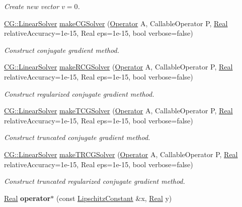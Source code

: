 \begin{DoxyCompactItemize}
\begin{DoxyCompactList}\small\item\em \-Create new vector $v=0$. \end{DoxyCompactList}\item 
\hyperlink{classSpacy_1_1CG_1_1LinearSolver}{\-C\-G\-::\-Linear\-Solver} \hyperlink{namespaceSpacy_a158f06b6790d44613c6533fbd3822e6a}{make\-C\-G\-Solver} (\hyperlink{classSpacy_1_1Operator}{\-Operator} \-A, \-Callable\-Operator \-P, \hyperlink{classSpacy_1_1Real}{\-Real} relative\-Accuracy=1e-\/15, Real eps=1e-\/15, bool verbose=false)
\begin{DoxyCompactList}\small\item\em \-Construct conjugate gradient method. \end{DoxyCompactList}\item 
\hyperlink{classSpacy_1_1CG_1_1LinearSolver}{\-C\-G\-::\-Linear\-Solver} \hyperlink{namespaceSpacy_af70adbdd6fafbe87bd7c79be078851d6}{make\-R\-C\-G\-Solver} (\hyperlink{classSpacy_1_1Operator}{\-Operator} \-A, \-Callable\-Operator \-P, \hyperlink{classSpacy_1_1Real}{\-Real} relative\-Accuracy=1e-\/15, Real eps=1e-\/15, bool verbose=false)
\begin{DoxyCompactList}\small\item\em \-Construct regularized conjugate gradient method. \end{DoxyCompactList}\item 
\hyperlink{classSpacy_1_1CG_1_1LinearSolver}{\-C\-G\-::\-Linear\-Solver} \hyperlink{namespaceSpacy_a8c2664d93c0a0049cd3849a3a0c973a8}{make\-T\-C\-G\-Solver} (\hyperlink{classSpacy_1_1Operator}{\-Operator} \-A, \-Callable\-Operator \-P, \hyperlink{classSpacy_1_1Real}{\-Real} relative\-Accuracy=1e-\/15, Real eps=1e-\/15, bool verbose=false)
\begin{DoxyCompactList}\small\item\em \-Construct truncated conjugate gradient method. \end{DoxyCompactList}\item 
\hyperlink{classSpacy_1_1CG_1_1LinearSolver}{\-C\-G\-::\-Linear\-Solver} \hyperlink{namespaceSpacy_af214c1f5a7c2e48d16370a7a386ca8df}{make\-T\-R\-C\-G\-Solver} (\hyperlink{classSpacy_1_1Operator}{\-Operator} \-A, \-Callable\-Operator \-P, \hyperlink{classSpacy_1_1Real}{\-Real} relative\-Accuracy=1e-\/15, Real eps=1e-\/15, bool verbose=false)
\begin{DoxyCompactList}\small\item\em \-Construct truncated regularized conjugate gradient method. \end{DoxyCompactList}\item 
\hypertarget{namespaceSpacy_a81f372bdfa76c83a44edab9f33c2e8c8}{\hyperlink{classSpacy_1_1Real}{\-Real} {\bfseries operator$\ast$} (const \hyperlink{classSpacy_1_1LipschitzConstant}{\-Lipschitz\-Constant} \&x, \hyperlink{classSpacy_1_1Real}{\-Real} y)}\label{namespaceSpacy_a81f372bdfa76c83a44edab9f33c2e8c8}


\end{DoxyCompactItemize}
